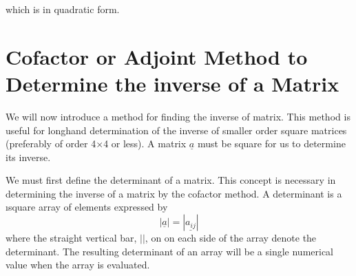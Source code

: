 \documentclass[12pt]{report}
\begin{document}
which is in quadratic form.


\section{Cofactor or Adjoint Method to Determine the inverse of a Matrix}

We will now introduce a method for finding the inverse of matrix. This
method is useful for longhand determination of the inverse of smaller
order square matrices (preferably of order 4$\times$4 or less). A
matrix $\underline{a}$ must be square for us to determine its inverse.


We must first define the determinant of a matrix. This concept is
necessary in determining the inverse of a matrix by the cofactor
method. A determinant is a \i{square array of elements expressed by}
\begin{equation} |\underline {a}| = |\underline{a_{ij}}|\end{equation}
where the straight vertical bar, $| |$, on on each side of the array denote
the determinant. The resulting determinant of an array will be a
single numerical value when the array is evaluated.
\end{document}

